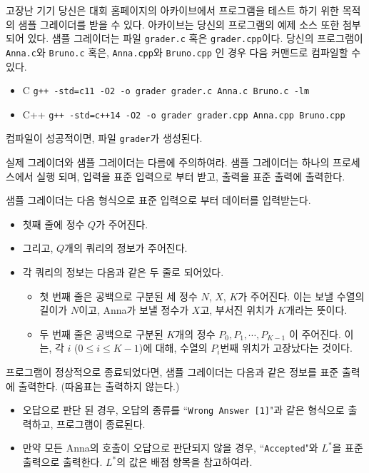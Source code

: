 \begin{problem}{고장난 기기}
	당신은 대회 홈페이지의 아카이브에서 프로그램을 테스트 하기 위한 목적의 샘플 그레이더를 받을 수 있다. 아카이브는 당신의 프로그램의 예제 소스 또한 첨부되어 있다.
	샘플 그레이더는 파일 \texttt{grader.c} 혹은 \texttt{grader.cpp}이다. 당신의 프로그램이 \texttt{Anna.c}와 \texttt{Bruno.c} 혹은, \texttt{Anna.cpp}와 \texttt{Bruno.cpp} 인 경우 다음 커맨드로 컴파일할 수 있다.
	
	\begin{itemize}
		\item C
		\texttt{g++ -std=c11 -O2 -o grader grader.c Anna.c Bruno.c -lm}
		\item C++
		\texttt{g++ -std=c++14 -O2 -o grader grader.cpp Anna.cpp Bruno.cpp }
	\end{itemize}
	
	컴파일이 성공적이면, 파일 \texttt{grader}가 생성된다.
	
	실제 그레이더와 샘플 그레이더는 다름에 주의하여라. 샘플 그레이더는 하나의 프로세스에서 실행 되며, 입력을 표준 입력으로 부터 받고, 출력을 표준 출력에 출력한다.
	
	\InputFile
	
	샘플 그레이더는 다음 형식으로 표준 입력으로 부터 데이터를 입력받는다.
	
	\begin{itemize}
		\item 첫째 줄에 정수 $Q$가 주어진다.
		\item 그리고, $Q$개의 쿼리의 정보가 주어진다.
		\item 각 쿼리의 정보는 다음과 같은 두 줄로 되어있다.
		\begin{itemize}
			\item 첫 번째 줄은 공백으로 구분된 세 정수 $N$, $X$, $K$가 주어진다. 이는 보낼 수열의 길이가 $N$이고, Anna가 보낼 정수가 $X$고, 부서진 위치가 $K$개라는 뜻이다.
			\item 두 번째 줄은 공백으로 구분된 $K$개의 정수 $P_0,P_1, \cdots, P_{K-1}$ 이 주어진다. 이는, 각 $i$ ($0 \le i \le K-1$)에 대해, 수열의 $P_i$번째 위치가 고장났다는 것이다.
		\end{itemize}
	\end{itemize}
	
	
	\OutputFile
	
	프로그램이 정상적으로 종료되었다면, 샘플 그레이더는 다음과 같은 정보를 표준 출력에 출력한다. (따옴표는 출력하지 않는다.)
	
	\begin{itemize}
		\item 오답으로 판단 된 경우, 오답의 종류를 ``\texttt{Wrong Answer [1]}"과 같은 형식으로 출력하고, 프로그램이 종료된다.
		\item 만약 모든 Anna의 호출이 오답으로 판단되지 않을 경우,  ``\texttt{Accepted}"와 $L^*$을 표준 출력으로 출력한다. $L^*$의 값은 배점 항목을 참고하여라. 
	\end{itemize}
	

\end{problem}
